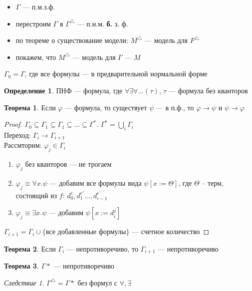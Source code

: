 \documentclass[english]{article}
\theoremstyle{plain}
\theoremstyle{remark}
\newtheorem{corollary}{Следствие}[theorem]
\theoremstyle{definition}
\newtheorem{theorem}{Теорема}[section]
\newtheorem*{definition}{Определение}
\begin{document}
\begin{itemize}
\item \(\Gamma\) --- п.м.з.ф.
\item перестроим \(\Gamma\) в \(\Gamma^\triangle\) --- п.н.м. \textbf{б.} з. ф.
\item по теореме о существование модели: \(M^\triangle\) --- модель для \(F^\triangle\)
\item покажем, что \(M^\triangle\) --- модель для \(\Gamma\) --- \(M\)
\end{itemize}
\(\Gamma_0 = \Gamma\), где все формулы --- в предварительной нормальной форме
\begin{definition}
ПНФ --- формула, где \(\forall \exists \forall \dots(\tau)\), \(\tau\) --- формула без кванторов
\end{definition}
\begin{theorem}
Если \(\varphi\) --- формула, то существует \(\psi\) --- в п.ф., то \(\varphi \to \psi\) и \(\psi \to \varphi\)
\end{theorem}
\begin{proof}
\(\Gamma_0 \subseteq \Gamma_1 \subseteq \Gamma_1 \subseteq \dots \subseteq \Gamma^*\). \(\Gamma^* = \bigcup_i \Gamma_i\) \\
Переход: \(\Gamma_i \to \Gamma_{i + 1}\) \\
Рассмторим: \(\varphi_j \in \Gamma_i\)
\begin{enumerate}
\item \(\varphi_j\) без кванторов --- не трогаем
\item \(\varphi_j \equiv \forall x. \psi\) --- добавим все формулы вида \(\psi[x := \Theta]\), где \(\Theta\) -- терм, состоящий из \(f\): \(d_0^e, d_1^{e'} \dots , d_{i - 1}^{e^{'\dots'}}\)
\item \(\varphi_j \equiv \exists x. \psi\) --- добавим \(\psi[x:=d^j_i]\)
\end{enumerate}
\(\Gamma_{i + 1} = \Gamma_i \cup \{\text{все добавленные формулы}\}\) --- счетное количество
\end{proof}
\begin{theorem}
Если \(\Gamma_i\) --- непротиворечиво, то \(\Gamma_{i + 1}\) --- непротиворечиво
\end{theorem}
\begin{theorem}
\(\Gamma*\) --- непротиворечиво
\end{theorem}
\begin{corollary}
\(\Gamma^\triangle = \Gamma*\) без формул с \(\forall, \exists\)
\end{corollary}
\end{document}
